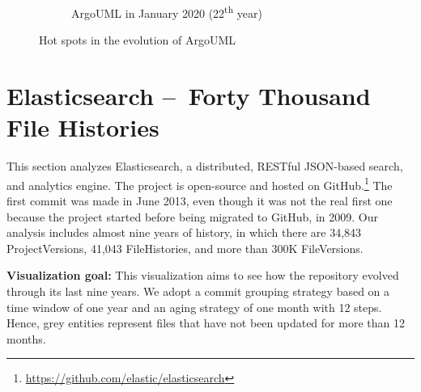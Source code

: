 \begin{figure}[ht]
\begin{subfigure}{0.48\textwidth}
        \caption{ArgoUML in January 2020 (22\textsuperscript{th} year)} 
        \label{fig:ArgoUML_V3_S6}
    \end{subfigure}
    
    \caption{Hot spots in the evolution of ArgoUML} 
    \label{fig:ArgoUML_V3}
\end{figure}
\clearpage

\section{Elasticsearch – Forty Thousand File Histories}
This section analyzes Elasticsearch, a distributed, RESTful JSON-based search, and analytics engine. 
The project is open-source and hosted on GitHub.\footnote{\url{https://github.com/elastic/elasticsearch}}
The first commit was made in June 2013, even though it was not the real first one because the project started before being migrated to GitHub, in 2009.
Our analysis includes almost nine years of history, in which there are 34,843 ProjectVersions, 41,043 FileHistories, and more than 300K FileVersions. 

\bigbreak
\noindent
\textbf{Visualization goal:}
This visualization aims to see how the repository evolved through its last nine years. We adopt a commit grouping strategy based on a time window of one year and an aging strategy of one month with 12 steps. Hence, grey entities represent files that have not been updated for more than 12 months. 


